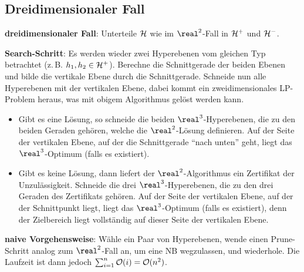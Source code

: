 \pagebreak

\subsection{%
    Dreidimensionaler Fall%
}

\textbf{dreidimensionaler Fall}:
Unterteile $\mathcal{H}$ wie im $\real^2$-Fall in $\mathcal{H}^+$ und $\mathcal{H}^-$.

\textbf{Search-Schritt}:
Es werden wieder zwei Hyperebenen vom gleichen Typ betrachtet (z.\,B. $h_1, h_2 \in \mathcal{H}^+$).
Berechne die Schnittgerade der beiden Ebenen und bilde die vertikale Ebene durch die Schnittgerade.
Schneide nun alle Hyperebenen mit der vertikalen Ebene,
dabei kommt ein zweidimensionales LP-Problem heraus, was mit obigem Algorithmus gelöst werden kann.
\begin{itemize}
    \item
    Gibt es eine Lösung, so schneide die beiden $\real^3$-Hyperebenen, die zu den beiden Geraden
    gehören, welche die $\real^2$-Lösung definieren.
    Auf der Seite der vertikalen Ebene, auf der die Schnittgerade "`nach unten"' geht,
    liegt das $\real^3$-Optimum (falls es existiert).

    \item
    Gibt es keine Lösung, dann liefert der $\real^2$-Algorithmus ein Zertifikat der Unzulässigkeit.
    Schneide die drei $\real^3$-Hyperebenen, die zu den drei Geraden des Zertifikats gehören.
    Auf der Seite der vertikalen Ebene, auf der der Schnittpunkt liegt, liegt das $\real^3$-Optimum
    (falls es existiert), denn der Zielbereich liegt vollständig auf dieser Seite der vertikalen
    Ebene.
\end{itemize}

\linie

\textbf{naive Vorgehensweise}:
Wähle ein Paar von Hyperebenen, wende einen Prune-Schritt analog zum $\real^2$-Fall an,
um eine NB wegzulassen, und wiederhole.
Die Laufzeit ist dann jedoch $\sum_{i=1}^n \mathcal{O}(i) = \mathcal{O}(n^2)$.

